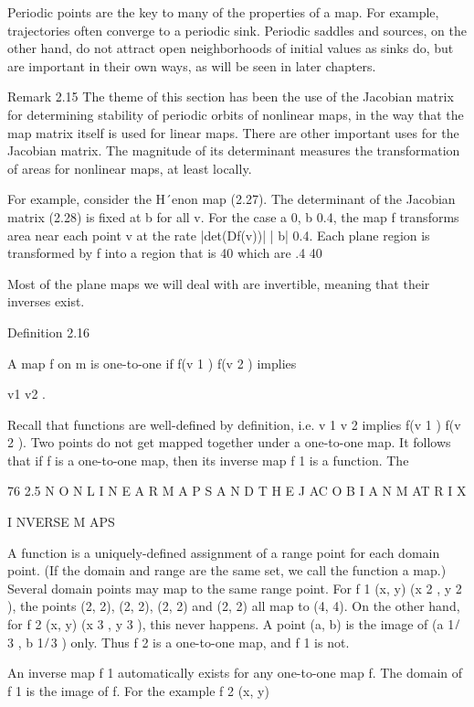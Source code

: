 \documentclass[12pt]{article}
\begin{document}
Periodic points are the key to many of the properties of a map. For example, trajectories often converge to a periodic sink. Periodic 
saddles and sources, on the other hand, do not attract open neighborhoods of initial values as sinks do, but are important in their 
own ways, as will be seen in later chapters.

Remark 2.15 The theme of this section has been the use of the Jacobian matrix for determining stability of periodic orbits of 
nonlinear maps, in the way that the map matrix itself is used for linear maps. There are other important uses for the Jacobian 
matrix. The magnitude of its determinant measures the transformation of areas for nonlinear maps, at least locally.

For example, consider the H´enon map (2.27). The determinant of the Jacobian matrix (2.28) is ﬁxed at b for all v. For the case a  
0, b  0.4, the map f transforms area near each point v at the rate |det(Df(v))|  |  b|  0.4. Each plane region is transformed by f 
into a region that is 40%
which are .4  40%

Most of the plane maps we will deal with are invertible, meaning that their inverses exist.

Deﬁnition 2.16

A map f on  m is one-to-one if f(v 1 )  f(v 2 ) implies

v1 v2 .

Recall that functions are well-deﬁned by deﬁnition, i.e. v 1  v 2 implies f(v 1 )  f(v 2 ). Two points do not get mapped together 
under a one-to-one map. It follows that if f is a one-to-one map, then its inverse map f 1 is a function. The

76 2.5 N O N L I N E A R M A P S A N D T H E J AC O B I A N M AT R I X

I NVERSE M APS

A function is a uniquely-deﬁned assignment of a range point for each domain point. (If the domain and range are the same set, we 
call the function a map.) Several domain points may map to the same range point. For f 1 (x, y)  (x 2 , y 2 ), the points (2, 2), (2, 
2), (2, 2) and (2, 2) all map to (4, 4). On the other hand, for f 2 (x, y)  (x 3 , y 3 ), this never happens. A point (a, b) is the 
image of (a 1 ̸ 3 , b 1 ̸ 3 ) only. Thus f 2 is a one-to-one map, and f 1 is not.

An inverse map f 1 automatically exists for any one-to-one map f. The domain of f 1 is the image of f. For the example f 2 (x, y) 
\end{document}
